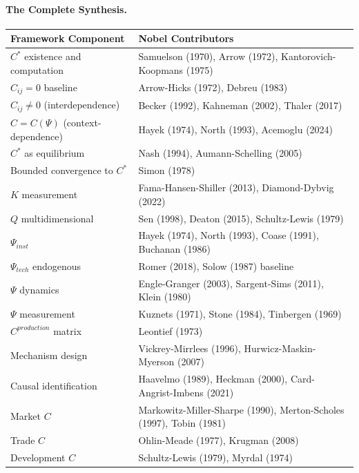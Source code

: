\documentclass[12pt,a4paper]{article}
\begin{document}
\paragraph{The Complete Synthesis.}
\begin{center}
\renewcommand{\arraystretch}{1.3}
\small
\begin{tabular}{ll}
\hline
\textbf{Framework Component} & \textbf{Nobel Contributors} \\
\hline
$C^*$ existence and computation & Samuelson (1970), Arrow (1972), Kantorovich-Koopmans (1975) \\
$C_{ij} = 0$ baseline & Arrow-Hicks (1972), Debreu (1983) \\
$C_{ij} \neq 0$ (interdependence) & Becker (1992), Kahneman (2002), Thaler (2017) \\
$C = C(\Psi)$ (context-dependence) & Hayek (1974), North (1993), Acemoglu (2024) \\
$C^*$ as equilibrium & Nash (1994), Aumann-Schelling (2005) \\
Bounded convergence to $C^*$ & Simon (1978) \\
$K$ measurement & Fama-Hansen-Shiller (2013), Diamond-Dybvig (2022) \\
$Q$ multidimensional & Sen (1998), Deaton (2015), Schultz-Lewis (1979) \\
$\Psi_{inst}$ & Hayek (1974), North (1993), Coase (1991), Buchanan (1986) \\
$\Psi_{tech}$ endogenous & Romer (2018), Solow (1987) baseline \\
$\Psi$ dynamics & Engle-Granger (2003), Sargent-Sims (2011), Klein (1980) \\
$\Psi$ measurement & Kuznets (1971), Stone (1984), Tinbergen (1969) \\
$C^{production}$ matrix & Leontief (1973) \\
Mechanism design & Vickrey-Mirrlees (1996), Hurwicz-Maskin-Myerson (2007) \\
Causal identification & Haavelmo (1989), Heckman (2000), Card-Angrist-Imbens (2021) \\
Market $C$ & Markowitz-Miller-Sharpe (1990), Merton-Scholes (1997), Tobin (1981) \\
Trade $C$ & Ohlin-Meade (1977), Krugman (2008) \\
Development $C$ & Schultz-Lewis (1979), Myrdal (1974) \\
\hline
\end{tabular}
\end{center}
\end{document}
